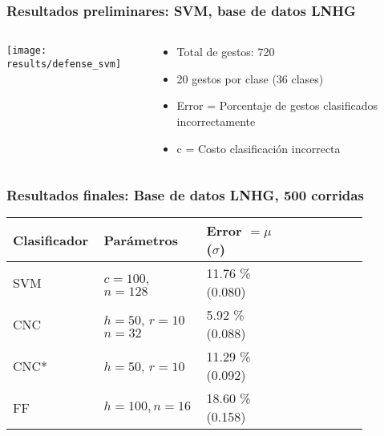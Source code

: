 \begin{myframe}
\frametitle{Resultados preliminares: SVM, base de datos LNHG}
\begin{columns}
\begin{column}{0.7\textwidth}
\centering
\texttt{[image: results/defense\_svm]}
\end{column}
\begin{column}{0.3\textwidth}
  \begin{itemize}
  \centering
  \item Total de gestos: 720 
  \item 20 gestos por clase (36 clases)
  \item Error = Porcentaje de gestos clasificados incorrectamente
  \item c = Costo clasificación incorrecta
  
  \end{itemize}
\end{column}
\end{columns}

\end{myframe}


\begin{frame}
\frametitle{Resultados finales: Base de datos LNHG, 500 corridas}
\vspace{-13pt}
\begin{table}[h]
\centering
\begin{tabulary}{\linewidth}{|C{0.22\linewidth}|C{0.22\linewidth}|C{0.22\linewidth}|C{0.22\linewidth}|}
\hline Clasificador & Parámetros &  Error $= \mu$ ($\sigma$) \\ 
\hline SVM & $c=100$, $n=128$ & 11.76 \%  (0.080)  \\ 
\hline CNC & $h=50$, $r=10$ $n=32$ & 5.92 \%  (0.088)\\ 
\hline CNC* & $h=50$, $r=10$ & 11.29 \% (0.092) \\ 
\hline FF & $h=100,n=16$ & 18.60 \% (0.158) \\ 
\hline 
\end{tabulary}
\end{table}

\vspace{-10pt}


\end{frame}


